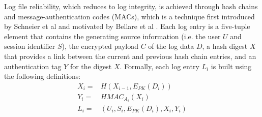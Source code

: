 \documentclass{sig-alternate}
\begin{document}
Log file reliability, which reduces to log integrity, is achieved through hash chains and 
message-authentication codes (MACs), which is a technique first introduced by Schneier et al 
\cite{Schneier1999-Secure} and motivated by Bellare et al \cite{Bellare1997-ForwardIntegrity}. 
Each log entry is a five-tuple element that contains the generating source
information (i.e. the user $U$ and session identifier $S$), the encrypted payload $C$ of the log data $D$, a 
hash digest $X$ that provides a link between the current and previous hash chain entries, and an 
authentication tag $Y$ for the digest $X$. Formally, each log entry $L_i$ is built using the following definitions:
\begin{align*}
X_i = & H(X_{i - 1}, E_{PK}(D_i)) \\ %
Y_i = & HMAC_{A_i}(X_i) \\ 
L_i = & (U_{i}, S_{i}, E_{PK}(D_i), X_i, Y_i) %
\end{align*}

\end{document}
